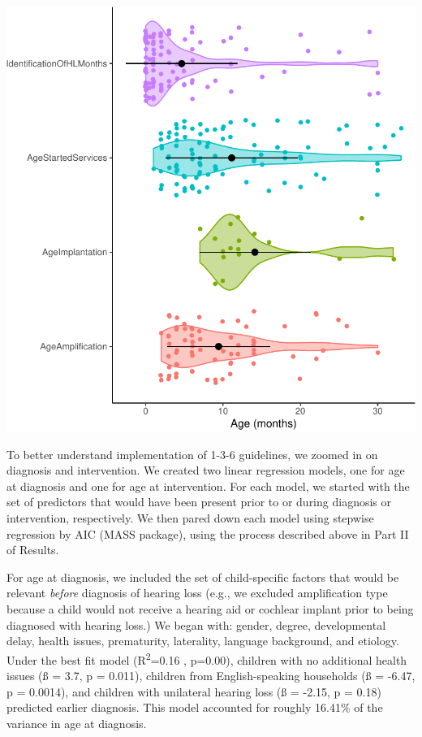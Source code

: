 \documentclass[english,man]{apa6}
\begin{document}
\includegraphics{ELSSP_paper_files/figure-latex/meets136-timeline-1.pdf}

To better understand implementation of 1-3-6 guidelines, we zoomed in on diagnosis and intervention. We created two linear regression models, one for age at diagnosis and one for age at intervention. For each model, we started with the set of predictors that would have been present prior to or during diagnosis or intervention, respectively. We then pared down each model using stepwise regression by AIC (MASS package), using the process described above in Part II of Results.

For age at diagnosis, we included the set of child-specific factors that would be relevant \emph{before} diagnosis of hearing loss (e.g., we excluded amplification type because a child would not receive a hearing aid or cochlear implant prior to being diagnosed with hearing loss.) We began with: gender, degree, developmental delay, health issues, prematurity, laterality, language background, and etiology. Under the best fit model (R\textsuperscript{2}=0.16 , p=0.00), children with no additional health issues (ß = 3.7, p = 0.011), children from English-speaking households (ß = -6.47, p = 0.0014), and children with unilateral hearing loss (ß = -2.15, p = 0.18) predicted earlier diagnosis. This model accounted for roughly 16.41\% of the variance in age at diagnosis.
\end{document}
